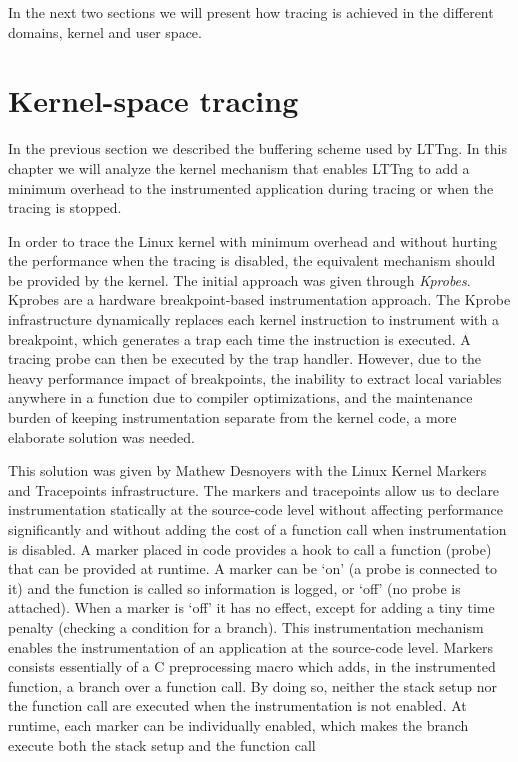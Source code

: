 In the next two sections we will present how tracing is achieved in the
different domains, kernel and user space.

\section{Kernel-space tracing}\label{sec:kernel-tracing}

In the previous section we described the buffering scheme used by LTTng. In this
chapter we will analyze the kernel mechanism that enables LTTng to add a minimum
overhead to the instrumented application during tracing or when the tracing is
stopped.

In order to trace the Linux kernel with minimum overhead and without hurting
the performance when the tracing is disabled, the equivalent mechanism should
be provided by the kernel. The initial approach was given through
\textit{Kprobes}\cite{kprobes}. Kprobes are a hardware breakpoint-based
instrumentation approach. The Kprobe infrastructure dynamically replaces each
kernel instruction to instrument with a breakpoint, which generates a trap each
time the instruction is executed. A tracing probe can then be executed by the
trap handler. However, due to the heavy performance impact of breakpoints, the
inability to extract local variables anywhere in a function due to compiler
optimizations, and the maintenance burden of keeping instrumentation separate
from the kernel code, a more elaborate solution was needed.

This solution was given by Mathew Desnoyers with the Linux Kernel Markers
\cite{kmarkers} and Tracepoints infrastructure. The markers and tracepoints
allow us to declare instrumentation statically at the source-code level without
affecting performance significantly and without adding the cost of a function
call when instrumentation is disabled. A marker placed in code provides a hook
to call a function (probe) that can be provided at runtime. A marker can be
`on' (a probe is connected to it) and the function is called so information is
logged, or `off' (no probe is attached). When a marker is `off' it has no
effect, except for adding a tiny time penalty (checking a condition for a
branch). This instrumentation mechanism enables the instrumentation of an
application at the source-code level. Markers consists essentially of a C
preprocessing macro which adds, in the instrumented function, a branch over a
function call. By doing so, neither the stack setup nor the function call are
executed when the instrumentation is not enabled. At runtime, each marker can
be individually enabled, which makes the branch execute both the stack setup
and the function call 


